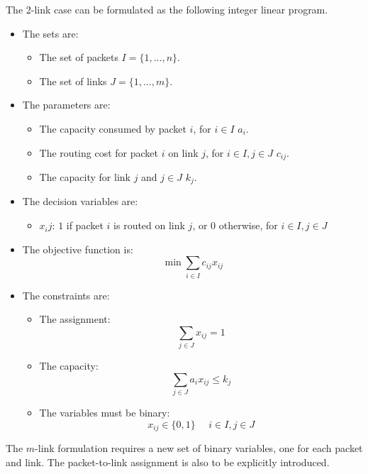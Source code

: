 \documentclass[12pt, a4paper]{report}
\newtheorem[style=M,bodystyle=\normalfont]{theorem}{Theorem}
\newtheorem[style=M,bodystyle=\normalfont]{corollary}{Corollary}
\newtheorem[style=M,bodystyle=\normalfont]{lemma}{Lemma}
\newtheorem[style=M,bodystyle=\normalfont]{definition}{Definition}
\begin{document}
    \begin{Answer}[ref=3]
        The 2-link case can be formulated as the following integer linear program. 
        \begin{itemize}
            \item The sets are: 
                \begin{itemize}
                    \item The set of packets $I=\{1,\dots,n\}$. 
                    \item The set of links $J=\{1,\dots,m\}$. 
                \end{itemize}
            \item The parameters are: 
                \begin{itemize}
                    \item The capacity consumed by packet $i$, for $i \in I$ $a_i$.
                    \item The routing cost for packet $i$ on link $j$, for $i \in I,j \in J$ $c_{ij}$.
                    \item The capacity for link $j$ and $j \in J$ $k_{j}$. 
                \end{itemize}
            \item The decision variables are:
                \begin{itemize}
                    \item $x_ij$: $1$ if packet $i$ is routed on link $j$, or 0 otherwise, for $i \in I,j \in J$
                \end{itemize}
            \item The objective function is: 
                \[\min{\sum_{i \in I}{c_{ij}x_{ij}}}\]
            \item The constraints are:
                \begin{itemize}
                    \item The assignment: 
                        \[\sum_{j \in J}x_{ij} = 1\]
                    \item The capacity: 
                        \[\sum_{j \in J}a_ix_{ij} \leq k_j\]
                    \item The variables must be binary: 
                        \[x_{ij} \in \{0,1\} \:\:\:\:\:\: i \in I,j \in J\]
                \end{itemize}
        \end{itemize}
        The $m$-link formulation requires a new set of binary variables, one for each packet and link. The packet-to-link assignment is also to be explicitly introduced. 
    \end{Answer}
\end{document}
